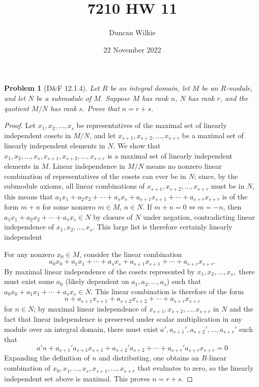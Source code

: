\documentclass{article}
\title{7210 HW 11}
\author{Duncan Wilkie}
\date{22 November 2022}
\newtheorem{plm}{Problem}
\begin{document}
\maketitle

\begin{plm}[D\&F 12.1.4]
  Let $R$ be an integral domain, let $M$ be an $R$-module, and let $N$ be a submodule of $M$.
  Suppose $M$ has rank $n$, $N$ has rank $r$, and the quotient $M / N$ has rank $s$.
  Prove that $n = r + s$.
\end{plm}

\begin{proof}
  Let $x_{1}, x_{2}, \ldots, x_{s}$ be representatives of the maximal set of linearly independent cosets in $M / N$,
  and let $x_{s+1}, x_{s+2}, \ldots, x_{s+r}$ be a maximal set of linearly independent elements in $N$.
  We show that $x_{1}, x_{2}, \ldots, x_{s}, x_{s+1}, x_{s+2}, \ldots, x_{s+r}$ is a maximal set of linearly independent elements in $M$.
  Linear independence in $M / N$ means no nonzero linear combination of representatives of the cosets can ever be in $N$;
  since, by the submodule axioms, all linear combinations of $x_{s+1}, x_{s+2}, \ldots, x_{s+r}$ must be in $N$,
  this means that $a_{1}x_{1} + a_{2}x_{2} + \cdots + a_{s}x_{s} + a_{s+1}x_{s+1} + \cdots + a_{s+r}x_{s+r}$ is of the form $m + n$ for some nonzero
  $m \in M$, $n \in N$.
  If $m + n = 0 \Leftrightarrow m = -n$, then $a_{1}x_{1} + a_{2}x_{2} + \cdots + a_{s}x_{s} \in N$ by closure of $N$ under negation,
  contradicting linear independence of $x_{1}, x_{2}, \ldots, x_{s}$.
  This large list is therefore certainly linearly independent

  For any nonzero $x_{0} \in M$, consider the linear combination
  \[
    a_{0}x_{0} + a_{1}x_{1} + \cdots + a_{s}x_{s} + a_{s+1}x_{s+1} + \cdots + a_{s+r}x_{s+r}.
  \]
  By maximal linear independence of the cosets represented by $x_{1}, x_{2}, \ldots, x_{s},$
  there must exist some $a_{0}$ (likely dependent on $a_{1}, a_{2}, \ldots, a_{s}$) such that $a_{0}x_{0} + a_{1}x_{1} + \cdots + a_{s}x_{s} \in N$.
  This linear combination is therefore of the form
  \[
    n + a_{s+1}x_{s+1} + a_{s+2}x_{s+2} + \cdots + a_{s+r}x_{s+r}
  \]
  for $n \in N$; by maximal linear independence of $x_{s+1}, x_{s+2}, \ldots, x_{s+r}$ in $N$
  and the fact that linear independence is preserved under scalar multiplication in any module over an integral domain,
  there must exist $a', a_{s+1}', a_{s+2}', \ldots, a_{s+r}'$ such that
  \[
    a'n + a_{s+1}'a_{s+1}x_{s+1} + a_{s+2}'a_{s+2} + \cdots + a_{s+r}'a_{s+r}x_{s+r} = 0
  \]
  Expanding the definition of $n$ and distributing, one obtains an $R$-linear combination of \newline
  $x_{0}, x_{1}, \ldots, x_{s}, x_{s+1}, \ldots, x_{s+r}$
  that evaluates to zero, so the linearly independent set above is maximal.
  This proves $n = r + s$.
\end{proof}
\end{document}
